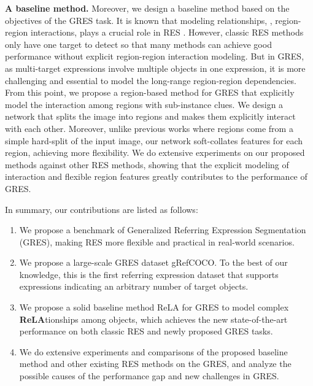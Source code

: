 \documentclass[10pt,twocolumn,letterpaper]{article}
\begin{document}
\textbf{A baseline method.} Moreover, we design a baseline method based on the objectives of the GRES task. It is known that modeling relationships, \eg, region-region interactions, plays a crucial role in RES \cite{yu2018mattnet}. However, classic RES methods
only have one target to detect so that many methods can achieve good performance without explicit region-region interaction modeling. But in GRES, as multi-target expressions involve multiple objects in one expression, 
it is more challenging and essential to model the long-range region-region dependencies. 
From this point, we propose a region-based method for GRES that explicitly model the interaction among regions with sub-instance clues. 
We design a network that splits the image into regions and makes them explicitly interact with each other.
Moreover, unlike previous works where regions come from a simple hard-split of the input image, our network soft-collates features for each region, achieving more flexibility. We do extensive experiments on our proposed methods against other RES methods, showing that the explicit modeling of interaction and flexible region features greatly contributes to the performance of GRES. 

In summary, our contributions are listed as follows:
\vspace{-1mm}
\begin{enumerate}
\setlength\itemsep{0em}
  \item We propose a benchmark of Generalized Referring Expression Segmentation (GRES), making RES more flexible and practical in real-world scenarios.
  \item We propose a large-scale GRES dataset gRefCOCO. To the best of our knowledge, this is the first referring expression dataset that supports expressions indicating an arbitrary number of target objects.
  \item We propose a solid baseline method ReLA for GRES to model complex \textbf{ReLA}tionships among objects, which achieves the new state-of-the-art performance on {{both classic RES and newly proposed GRES}} tasks.
  \item We do extensive experiments and comparisons of the proposed baseline method and other existing RES methods on the GRES, and analyze the possible causes of the performance gap and new challenges in GRES.
\end{enumerate}
\end{document}
